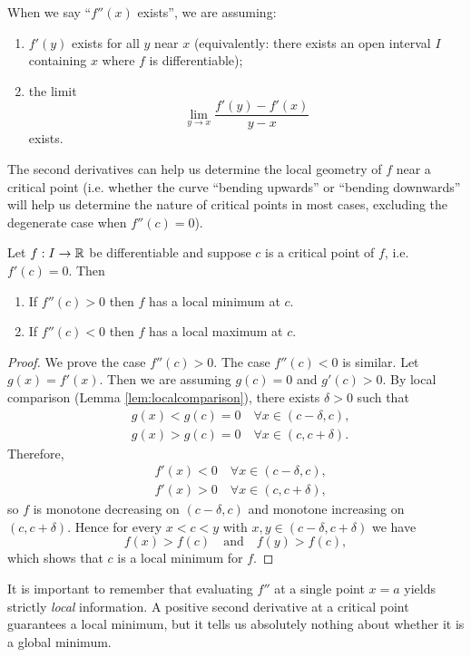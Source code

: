 \documentclass[../analysis1.tex]{subfiles}
\begin{document}
When we say ``$f''(x)$ exists'', we are assuming:
\begin{enumerate}
    \item $f'(y)$ exists for all $y$ near $x$ (equivalently: there exists an open interval $I$ containing $x$ where $f$ is differentiable);
    \item the limit
    \[
    \lim_{y \to x} \frac{f'(y) - f'(x)}{y - x}
    \]
    exists.
\end{enumerate}

The second derivatives can help us determine the local geometry of $f$ near a critical point (i.e. whether the curve ``bending upwards'' or ``bending downwards'' will help us determine the nature of critical points in most cases, excluding the degenerate case when $f''(c)=0$).

\begin{theorem}
    \begin{shaded*}
        Let $f:I\to\mathbb{R}$ be differentiable and suppose $c$ is a critical point of $f$, i.e. $f'(c) = 0$. Then
        \begin{enumerate}
            \item[1.] If $f''(c) > 0$ then $f$ has a local minimum at $c$.
            \item[2.] If $f''(c) < 0$ then $f$ has a local maximum at $c$.
        \end{enumerate}
    \end{shaded*}
\end{theorem}

\begin{proof}
We prove the case $f''(c) > 0$. The case $f''(c) < 0$ is similar.
Let $g(x) = f'(x)$. Then we are assuming $g(c) = 0$ and $g'(c) > 0$. By local comparison (Lemma \ref{lem:localcomparison}), there exists $\delta > 0$ such that
\begin{align*}
&g(x) < g(c) = 0 \quad \forall x \in (c - \delta, c), \\
&g(x) > g(c) = 0 \quad \forall x \in (c, c + \delta).
\end{align*}
Therefore,
\begin{align*}
&f'(x) < 0 \quad \forall x \in (c - \delta, c), \\
&f'(x) > 0 \quad \forall x \in (c, c + \delta),
\end{align*}
so $f$ is monotone decreasing on $(c - \delta, c)$ and monotone increasing on $(c, c+ \delta)$. Hence for every $x < c < y$ with $x, y \in (c - \delta, c + \delta)$ we have
\[
f(x) > f(c) \quad \text{and} \quad f(y) > f(c),
\]
which shows that $c$ is a local minimum for $f$.\qedhere
\end{proof}
It is important to remember that evaluating $f''$ at a single point $x=a$ yields strictly \textit{local} information. A positive second derivative at a critical point guarantees a local minimum, but it tells us absolutely nothing about whether it is a global minimum.
    
\end{document}
